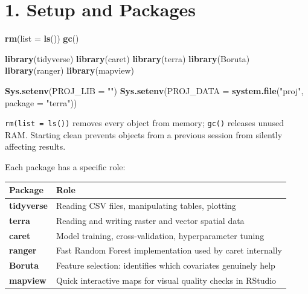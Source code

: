 \documentclass[
  10pt,
  b5paper,
  oneside]{book}
\newenvironment{Shaded}{\begin{snugshade}}{\end{snugshade}}
\newcommand{\AttributeTok}[1]{\textcolor[rgb]{0.13,0.29,0.53}{#1}}
\newcommand{\FunctionTok}[1]{\textcolor[rgb]{0.13,0.29,0.53}{\textbf{#1}}}
\newcommand{\NormalTok}[1]{#1}
\newcommand{\StringTok}[1]{\textcolor[rgb]{0.31,0.60,0.02}{#1}}
\begin{document}
\section{1. Setup and Packages}\label{setup-and-packages}

\begin{Shaded}
\begin{Highlighting}[]
\FunctionTok{rm}\NormalTok{(}\AttributeTok{list =} \FunctionTok{ls}\NormalTok{())}
\FunctionTok{gc}\NormalTok{()}

\FunctionTok{library}\NormalTok{(tidyverse)}
\FunctionTok{library}\NormalTok{(caret)}
\FunctionTok{library}\NormalTok{(terra)}
\FunctionTok{library}\NormalTok{(Boruta)}
\FunctionTok{library}\NormalTok{(ranger)}
\FunctionTok{library}\NormalTok{(mapview)}

\FunctionTok{Sys.setenv}\NormalTok{(}\AttributeTok{PROJ\_LIB =} \StringTok{""}\NormalTok{)  }
\FunctionTok{Sys.setenv}\NormalTok{(}\AttributeTok{PROJ\_DATA =} \FunctionTok{system.file}\NormalTok{(}\StringTok{"proj"}\NormalTok{, }\AttributeTok{package =} \StringTok{"terra"}\NormalTok{))}
\end{Highlighting}
\end{Shaded}

\texttt{rm(list\ =\ ls())} removes every object from memory; \texttt{gc()} releases unused RAM. Starting clean prevents objects from a previous session from silently affecting results.

Each package has a specific role:

\begin{longtable}[]{@{}
  >{\raggedright\arraybackslash}p{}
  >{\raggedright\arraybackslash}p{}@{}}
\toprule\noalign{}
\begin{minipage}[b]{\linewidth}\raggedright
Package
\end{minipage} & \begin{minipage}[b]{\linewidth}\raggedright
Role
\end{minipage} \\
\midrule\noalign{}
\endhead
\bottomrule\noalign{}
\endlastfoot
\textbf{tidyverse} & Reading CSV files, manipulating tables, plotting \\
\textbf{terra} & Reading and writing raster and vector spatial data \\
\textbf{caret} & Model training, cross-validation, hyperparameter tuning \\
\textbf{ranger} & Fast Random Forest implementation used by caret internally \\
\textbf{Boruta} & Feature selection: identifies which covariates genuinely help \\
\textbf{mapview} & Quick interactive maps for visual quality checks in RStudio \\
\end{longtable}
\end{document}
